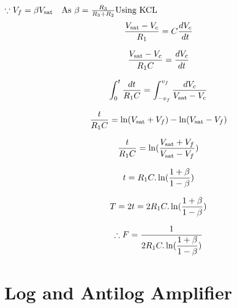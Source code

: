 \documentclass[a4paper, 12pt]{report}
\begin{document}
\begin{center}
\begin{center}
\begin{center}
\begin{center}
\begin{center}
\begin{center}
\begin{center}
\begin{center}
\begin{center}
\begin{center}
\begin{center}
\begin{center}
\begin{math}
    \because V_f = \beta V_\text{sat} \quad \text{As\ } \beta = \frac{R_3}{R_3+R_2} \\
    \text{Using\ KCL\ }
\end{math}
\begin{equation}
    \notag
    \frac{V_\text{sat} - V_c}{R_1} = C\frac{dV_c}{dt}\\
\end{equation}

\begin{equation}
    \notag
    \frac{V_\text{sat} - V_c}{R_1C} = \frac{dV_c}{dt}\\
\end{equation}

\begin{equation}    \notag
    \int_{0}^{t}  \frac{dt}{R_1C} = \int_{-v_f}^{v_f} \frac{dV_c}{V_\text{sat} - V_c}
\end{equation}

\begin{equation}    \notag
    \frac{t}{R_1C} = \ln (V_\text{sat} + V_f) - \ln (V_\text{sat} - V_f)
\end{equation}

\begin{equation}    \notag
    \frac{t}{R_1C} = \ln (\frac{V_\text{sat} + V_f}{V_\text{sat}-V_f})   
\end{equation}

\begin{equation}    \notag
    t = R_1C . \ln (\frac{1 + \beta}{1-\beta})   
\end{equation}

\begin{equation}    \notag
    T = 2t = 2R_1C . \ln (\frac{1 + \beta}{1-\beta})   
\end{equation}

\begin{equation}    \notag
    \therefore F = \frac{1}{2R_1C . \ln (\dfrac{1 + \beta}{1-\beta})}   
\end{equation}

\section{Log and Antilog Amplifier}
\begin{multicols}{2}

\end{multicols}
\end{center}
\end{center}
\end{center}
\end{center}
\end{center}
\end{center}
\end{center}
\end{center}
\end{center}
\end{center}
\end{center}
\end{center}
\end{document}
